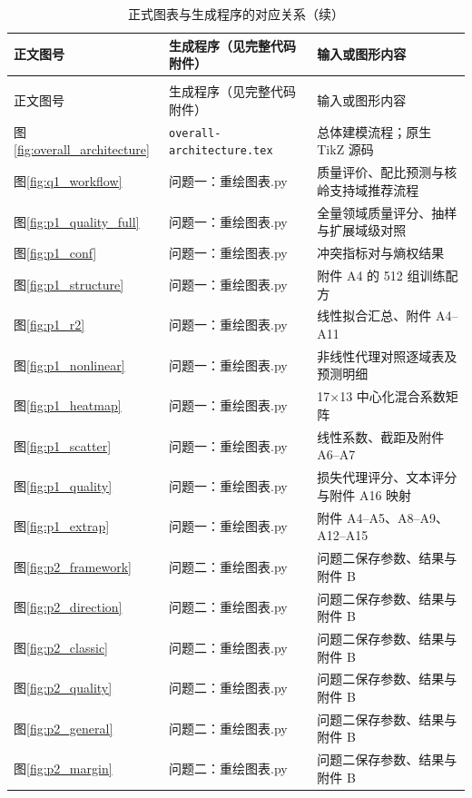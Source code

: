 \FloatBarrier
\begin{longtable}{@{}p{}p{}p{}@{}}
\caption{正式图表与生成程序的对应关系}\label{tab:figure_code_map}\\
\toprule
正文图号 & 生成程序（见完整代码附件） & 输入或图形内容\\
\midrule
\endfirsthead
\caption[]{正式图表与生成程序的对应关系（续）}\\
\toprule
正文图号 & 生成程序（见完整代码附件） & 输入或图形内容\\
\midrule
\endhead
\bottomrule
\endfoot
图\ref{fig:overall_architecture} & \texttt{overall-\allowbreak{}architecture.tex} & 总体建模流程；原生 TikZ 源码 \\
图\ref{fig:q1_workflow} & 问题一：重绘图表.py & 质量评价、配比预测与核岭支持域推荐流程 \\
图\ref{fig:p1_quality_full} & 问题一：重绘图表.py & 全量领域质量评分、抽样与扩展域级对照 \\
图\ref{fig:p1_conf} & 问题一：重绘图表.py & 冲突指标对与熵权结果 \\
图\ref{fig:p1_structure} & 问题一：重绘图表.py & 附件 A4 的 512 组训练配方 \\
图\ref{fig:p1_r2} & 问题一：重绘图表.py & 线性拟合汇总、附件 A4--A11 \\
图\ref{fig:p1_nonlinear} & 问题一：重绘图表.py & 非线性代理对照逐域表及预测明细 \\
图\ref{fig:p1_heatmap} & 问题一：重绘图表.py & 17×13 中心化混合系数矩阵 \\
图\ref{fig:p1_scatter} & 问题一：重绘图表.py & 线性系数、截距及附件 A6--A7 \\
图\ref{fig:p1_quality} & 问题一：重绘图表.py & 损失代理评分、文本评分与附件 A16 映射 \\
图\ref{fig:p1_extrap} & 问题一：重绘图表.py & 附件 A4--A5、A8--A9、A12--A15 \\
图\ref{fig:p2_framework} & 问题二：重绘图表.py & 问题二保存参数、结果与附件 B \\
图\ref{fig:p2_direction} & 问题二：重绘图表.py & 问题二保存参数、结果与附件 B \\
图\ref{fig:p2_classic} & 问题二：重绘图表.py & 问题二保存参数、结果与附件 B \\
图\ref{fig:p2_quality} & 问题二：重绘图表.py & 问题二保存参数、结果与附件 B \\
图\ref{fig:p2_general} & 问题二：重绘图表.py & 问题二保存参数、结果与附件 B \\
图\ref{fig:p2_margin} & 问题二：重绘图表.py & 问题二保存参数、结果与附件 B \\

\end{longtable}
